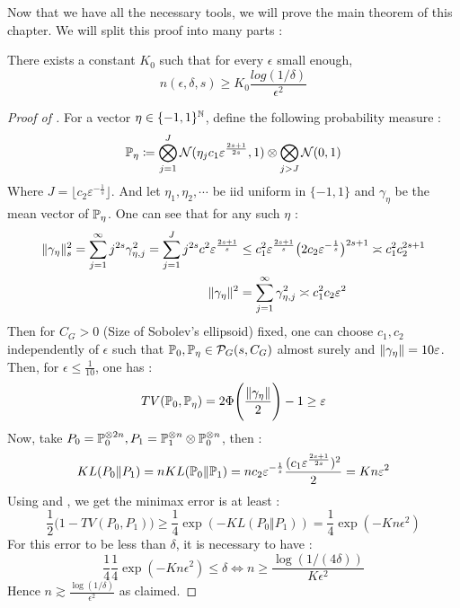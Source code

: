 Now that we have all the necessary tools, we will prove the main theorem of this chapter. We will split this proof into many parts : 
\begin{prop}\label{param}\cite{gerberclas}
    There exists a constant $K_0$ such that for every $\epsilon$ small enough, \begin{equation}\label{parameq}
        n(\epsilon,\delta,s) \geq K_0 \frac{log(1/\delta)}{\epsilon^2}
    \end{equation}
\end{prop}
\begin{proof}[Proof of ] 
    For a vector $\eta \in \{-1,1\}^\N$, define the following probability measure : 
    \begin{equation}\label{randomproba}
        \P_\eta \coloneqq \bigotimes_{j=1}^J \mathcal{N}(\eta_jc_1 \epsilon^{\frac{2s+1}{2s}},1) \otimes \bigotimes_{j>J} \mathcal{N}(0,1)
    \end{equation}
    Where $J = \big\lfloor c_2\varepsilon^{-\frac{1}{s}}\big\rfloor$. And let $\eta_1,\eta_2,\cdots$ be iid uniform in $\{-1,1\}$ and $\gamma_\eta$ be the mean vector of $\P_\eta$. One can see that for any such $\eta$ : 
    \begin{align*}
        \norm{\gamma_\eta}_s^2 = \sum_{j=1}^{\infty} j^{2s}\gamma_{\eta,j}^2 = \sum_{j=1}^{J}j^{2s}c^2\epsilon^{\frac{2s+1}{s}} &\leq c_1^2 \epsilon^{\frac{2s+1}{s}} \bigl( 2c_2\epsilon^{-\frac{1}{s}} \bigr)^{2s+1} \asymp c_1^2c_2^{2s+1}\\
        \normp[2]{\gamma_\eta} &= \sum_{j=1}^{\infty} \gamma_{\eta,j}^2 \asymp c_1^2c_2\epsilon^2
    \end{align*}
    Then for $C_G >0$ (Size of Sobolev's ellipsoid) fixed, one can choose $c_1,c_2$ independently of $\epsilon$ such that $\P_0,\P_\eta \in \mathcal{P}_G(s,C_G)$ almost surely and $\norm{\gamma_\eta} = 10\epsilon$. 
    Then, for $\epsilon \leq \frac{1}{10}$, one has : 
    \begin{equation*}
        TV(\P_0,\P_\eta) = 2 \Phi\Biggl(\frac{\norm{\gamma_\eta}}{2}\Biggr) - 1 \geq \epsilon
    \end{equation*}
    Now, take $P_0 = \P_0^{\otimes2n}, P_1 = \P_1^{\otimes n} \otimes \P_0^{\otimes n}$, then : \begin{equation*}
        KL(P_0\Vert P_1) = n KL(\P_0 \Vert \P_1) = nc_2 \epsilon^{-\frac{1}{s}}\frac{(c_1 \epsilon^{\frac{2s+1}{2s}})^2}{2} = K n\epsilon^2
    \end{equation*}
    Using  and , we get the minimax error is at least : \begin{equation*}
        \frac{1}{2}\bigl(1-TV(P_0,P_1) \bigr)\geq \frac{1}{4}\exp(-KL(P_0\Vert P_1)) = \frac{1}{4}\exp(-Kn\epsilon^2) 
    \end{equation*}
    For this error to be less than $\delta$, it is necessary to have : \begin{equation*}
        \frac{1}{4}\frac{1}{4}\exp(-Kn\epsilon^2) \leq \delta \Leftrightarrow n \geq \frac{\log(1/(4\delta))}{K\epsilon^2}
    \end{equation*}
    Hence $n \gtrsim \frac{\log(1/\delta)}{\epsilon^2}$ as claimed.
\end{proof}
